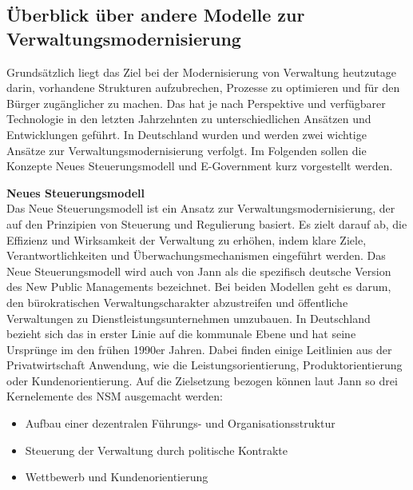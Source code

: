\subsection{Überblick über andere Modelle zur Verwaltungsmodernisierung}\label{Ueberblick}
Grundsätzlich liegt das Ziel bei der Modernisierung von Verwaltung heutzutage darin, vorhandene Strukturen aufzubrechen, Prozesse zu optimieren und für den Bürger zugänglicher zu machen.
Das hat je nach Perspektive und verfügbarer Technologie in den letzten Jahrzehnten zu unterschiedlichen Ansätzen und Entwicklungen geführt.
In Deutschland wurden und werden zwei wichtige Ansätze zur Verwaltungsmodernisierung verfolgt.
Im Folgenden sollen die Konzepte \glqq{}Neues Steuerungsmodell\grqq{} und \glqq{}E-Government\grqq{} kurz vorgestellt werden.

\textbf{Neues Steuerungsmodell}\\%
Das Neue Steuerungsmodell ist ein Ansatz zur Verwaltungsmodernisierung, der auf den Prinzipien von Steuerung und Regulierung basiert. 
Es zielt darauf ab, die Effizienz und Wirksamkeit der Verwaltung zu erhöhen, indem klare Ziele, Verantwortlichkeiten und Überwachungsmechanismen eingeführt werden.
Das Neue Steuerungsmodell wird auch von Jann als die \glqq{}spezifisch deutsche Version\grqq{} \citep[vgl.][S. 127]{Jann2019} des \glqq{}New Public Managements\grqq{} bezeichnet.
Bei beiden Modellen geht es darum, den bürokratischen Verwaltungscharakter abzustreifen und öffentliche Verwaltungen zu Dienstleistungsunternehmen umzubauen.
In Deutschland bezieht sich das in erster Linie auf die kommunale Ebene und hat seine Ursprünge im den frühen 1990er Jahren.
Dabei finden einige Leitlinien aus der Privatwirtschaft Anwendung, wie die Leistungsorientierung, Produktorientierung oder Kundenorientierung.
Auf die Zielsetzung bezogen können laut Jann so drei Kernelemente des NSM \citep[vgl.][S. 127]{Jann2019} ausgemacht werden:

\begin{itemize}
  \item Aufbau einer dezentralen Führungs- und Organisationsstruktur
  \item Steuerung der Verwaltung durch politische Kontrakte
  \item Wettbewerb und Kundenorientierung
\end{itemize}

